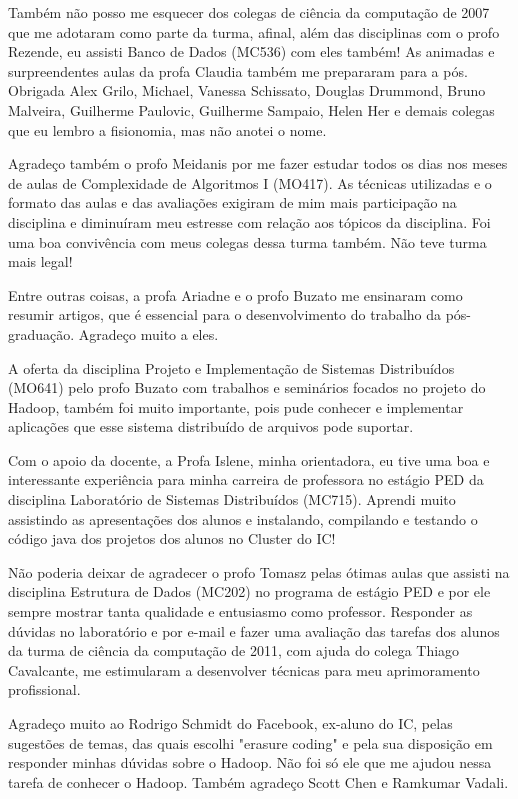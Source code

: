 Também não posso me esquecer dos colegas de ciência da computação de 2007 que me adotaram como parte da turma, afinal, além das disciplinas com o profo Rezende, eu assisti Banco de Dados (MC536) com eles também! As animadas e surpreendentes aulas da profa Claudia também me prepararam para a pós. Obrigada Alex Grilo, Michael, Vanessa Schissato, Douglas Drummond, Bruno Malveira, Guilherme Paulovic, Guilherme Sampaio, Helen Her e demais colegas que eu lembro a fisionomia, mas não anotei o nome.

Agradeço também o profo Meidanis por me fazer estudar todos os dias nos meses de aulas de Complexidade de Algoritmos I (MO417). As técnicas utilizadas e o formato das aulas e das avaliações exigiram de mim mais participação na disciplina e diminuíram meu estresse com relação aos tópicos da disciplina. Foi uma boa convivência com meus colegas dessa turma também. Não teve turma mais legal!

Entre outras coisas, a profa Ariadne e o profo Buzato me ensinaram como resumir artigos, que é essencial para o desenvolvimento do trabalho da pós-graduação. Agradeço muito a eles.

A oferta da disciplina Projeto e Implementação de Sistemas Distribuídos (MO641) pelo profo Buzato com trabalhos e seminários focados no projeto do Hadoop, também foi muito importante, pois pude conhecer e implementar aplicações que esse sistema distribuído de arquivos pode suportar.

Com o apoio da docente, a Profa Islene, minha orientadora, eu tive uma boa e interessante experiência para minha carreira de professora no estágio PED da disciplina Laboratório de Sistemas Distribuídos (MC715). Aprendi muito assistindo as apresentações dos alunos e instalando, compilando e testando o código java dos projetos dos alunos no Cluster do IC!

Não poderia deixar de agradecer o profo Tomasz pelas ótimas aulas que assisti na disciplina Estrutura de Dados (MC202) no programa de estágio PED e por ele sempre mostrar tanta qualidade e entusiasmo como professor. Responder as dúvidas no laboratório e por e-mail e fazer uma avaliação das tarefas dos alunos da turma de ciência da computação de 2011, com ajuda do colega Thiago Cavalcante, me estimularam a desenvolver técnicas para meu aprimoramento profissional.

Agradeço muito ao Rodrigo Schmidt do Facebook, ex-aluno do IC, pelas sugestões de temas, das quais escolhi "erasure coding" e pela sua disposição em responder minhas dúvidas sobre o Hadoop. Não foi só ele que me ajudou nessa tarefa de conhecer o Hadoop. Também agradeço Scott Chen e Ramkumar Vadali.

